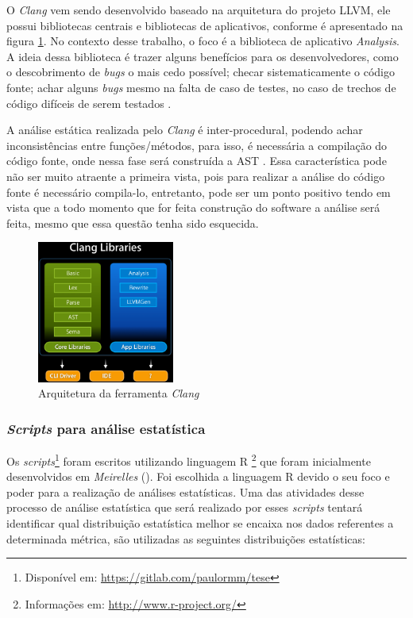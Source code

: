 O \emph{Clang} vem sendo desenvolvido baseado na arquitetura do projeto LLVM, ele possui bibliotecas centrais e bibliotecas de 
aplicativos, conforme é apresentado na figura \ref{clang_arch}. No contexto desse trabalho, o foco é a biblioteca de aplicativo
\textit{Analysis}. A ideia dessa biblioteca é trazer alguns benefícios para os desenvolvedores, como o descobrimento de 
\textit{bugs} o mais cedo possível; checar sistematicamente o código fonte; achar alguns \textit{bugs} mesmo na falta de caso
de testes, no caso de trechos de código difíceis de serem testados \cite{kremenek2009}. 

A análise estática realizada pelo \emph{Clang} é inter-procedural, podendo achar inconsistências entre funções/métodos, para isso,
é necessária a compilação do código fonte, onde nessa fase será construída a AST 
\cite{kremenek2009}. Essa característica pode não ser muito atraente a primeira vista, pois para realizar a análise do código 
fonte é necessário compila-lo, entretanto, pode ser um ponto positivo tendo em vista que a todo momento que for feita 
construção do software a análise será feita, mesmo que essa questão tenha sido esquecida.

\begin{figure}[h]
  \centering
  \includegraphics[width=0.4\textwidth]
      {figuras/clang_arch.eps}
      \caption{Arquitetura da ferramenta \emph{Clang}}
  \label{clang_arch}
\end{figure}

\subsubsection{\textit{Scripts} para análise estatística} \label{scripts}

Os \textit{scripts}\footnote{Disponível em:
\url{https://gitlab.com/paulormm/tese}} foram escritos utilizando linguagem R
\footnote{Informações em: \url{http://www.r-project.org/}} que foram
inicialmente desenvolvidos em \emph{Meirelles} (\citeyear{meirelles2013}). Foi escolhida a linguagem R
devido o seu foco e poder para a realização de análises estatísticas. Uma das
atividades desse processo de análise estatística que será realizado
por esses \textit{scripts} tentará identificar qual distribuição estatística melhor se encaixa nos dados referentes a 
determinada métrica, são utilizadas as seguintes distribuições estatísticas:

